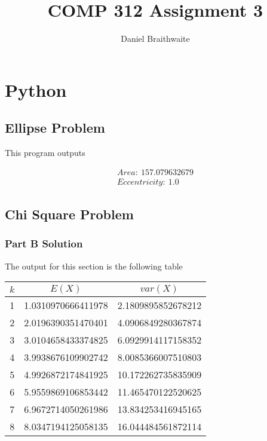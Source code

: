 \documentclass{article}
\title{COMP 312 Assignment 3}
\author{Daniel Braithwaite}
\begin{document}
	\maketitle
	\newpage
  	
  	\section{Python}
  		\subsection{Ellipse Problem}
  			
  			
  			This program outputs
  			
  			\begin{align}
  				Area:\ 157.079632679\\
				Eccentricity:\ 1.0
  			\end{align}

		\subsection{Chi Square Problem}
			\subsubsection{Part B Solution}
							


				The output for this section is the following table\\
				\begin{center}
					\begin{tabular}{ c c c }
						$k$ & $E(X)$ & $var(X)$\\
						\hline
						1 & 1.0310970666411978 & 2.1809895852678212\\
						2 & 2.0196390351470401 & 4.0906849280367874\\
						3 & 3.0104658433374825 & 6.0929914117158352\\
						4 & 3.9938676109902742 & 8.0085366007510803\\
						5 & 4.9926872174841925 & 10.172262735835909\\
						6 & 5.9559869106853442 & 11.465470122520625\\
						7 & 6.9672714050261986 & 13.834253416945165\\
						8 & 8.0347194125058135 & 16.044484561872114\\
					\end{tabular}
				\end{center}
							
\end{document}
